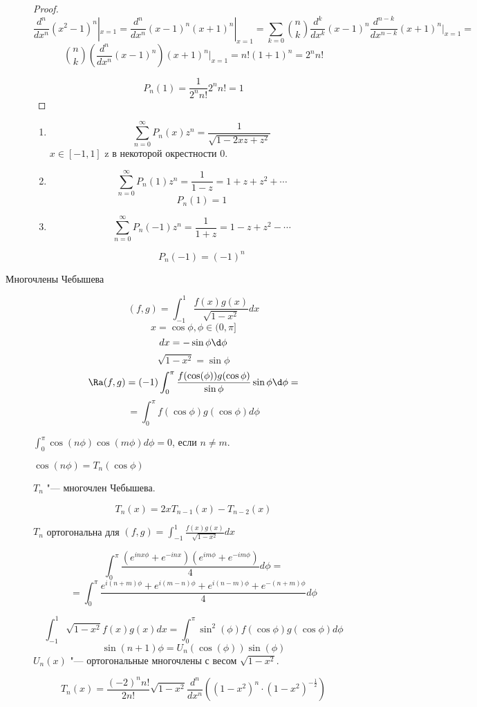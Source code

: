 \begin{description}
\begin{proof}
    $$\frac{d^n}{dx^n}(x^2 - 1)^n|_{x = 1} = \frac{d^n}{dx^n}(x - 1)^n(x + 1)^n|_{x = 1} = \sum_{k = 0}\binom{n}{k}\frac{d^k}{dx^k}(x - 1)^n\frac{d^{n - k}}{dx^{n - k}}(x + 1)^n|_{x = 1} = $$
    $$ \binom{n}{k}(\frac{d^n}{dx^n}(x - 1)^n)(x + 1)^n|_{x = 1} = n!(1 + 1)^n = 2^nn!$$

    $$P_n(1) = \frac{1}{2^nn!}2^nn! = 1$$
    \end{proof}

    \begin{theorem}\hfill
    \begin{enumerate}
    \item
    $$\sum_{n = 0}^{\infty}P_n(x)z^n = \frac{1}{\sqrt{1 - 2xz + z^2}}$$
    $x \in [-1,1]$ z в некоторой окрестности 0.
    \item
    $$\sum_{n = 0}^{\infty}P_n(1)z^n = \frac{1}{1 - z} = 1 + z + z^2 + \cdots $$
    $$P_n(1) = 1$$
    \item
    $$\sum_{n = 0}^{\infty}P_n(-1)z^n = \frac{1}{1 + z} = 1 - z + z^2 - \cdots$$

    $$P_n(-1) = (-1)^n $$
    \end{enumerate}
    \end{theorem}
\item[Многочлены Чебышева]
$$(f, g) = \int_{-1}^{1} \frac{f(x)g(x)}{\sqrt{1 - x^2}}dx$$
$$x = \cos \phi, \phi \in (0, \pi]$$
$$dx = -\sin \phi \d\phi $$
$$\sqrt{1 - x^2} = \sin \phi$$
$$\Ra (f, g) = (-1)\int_{0}^{\pi}\frac{f(\cos(\phi))g(\cos \phi)}{\sin \phi}\sin \phi \d \phi = $$
$$= \int_{0}^{\pi}f(\cos \phi)g(\cos \phi) d \phi$$

$\int_{0}^{\pi}\cos(n\phi)\cos(m\phi) d \phi = 0$, если $n \ne m$.

$\cos(n \phi) = T_n(\cos \phi)$

$T_n$ "--- многочлен Чебышева. 

$$T_n(x) = 2xT_{n - 1}(x) - T_{n - 2}(x)$$

$T_n$ ортогональна для $(f, g) = \int_{-1}^{1}\frac{f(x)g(x)}{\sqrt{1 - x^2}}dx$

$$\int_{0}^{\pi}\frac{(e^{inx\phi} + e^{-inx})(e^{im\phi} + e^{-im\phi})}{4} d\phi =  $$
$$= \int_{0}^{\pi}\frac{e^{i(n + m)\phi} + e^{i(m - n) \phi} + e^{i(n - m) \phi} + e^{-(n + m)\phi}}{4}d\phi $$

$$\int_{-1}^{1}\sqrt{1 - x^2}f(x)g(x)dx = \int_{0}^{\pi}\sin^2(\phi)f(\cos \phi)g(\cos \phi) d \phi$$
$$\sin(n + 1)\phi= U_n(\cos(\phi))\sin(\phi)$$
$U_n(x)$ "--- ортогональные многочлены с весом $\sqrt{1 - x^2}$.

$$T_n(x) = \frac{(-2)^nn!}{2n!}\sqrt{1 - x^2}\frac{d^n}{dx^n}((1 - x^2)^n \cdot (1 - x^2)^{-\frac{1}{2}}) $$


\end{description}
